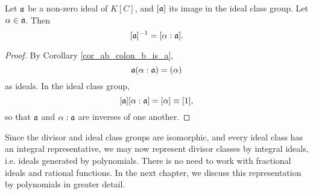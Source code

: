 \begin{proposition}
  \label{prop_integral_ideal_inverse}
  Let $\frak a$ be a non-zero ideal of $K[C]$,
  and $[\frak a]$ its image in the ideal class group.
  Let $\alpha \in \frak a$. Then
  \[ [\frak a]^{-1} = [\alpha : \frak a]. \]
\end{proposition}
\begin{proof}
  By Corollary \ref{cor_ab_colon_b_is_a},
  \[ \frak a(\alpha : \frak a) = (\alpha) \]
  as ideals.
  In the ideal class group,
  \[ [\frak a][\alpha : \frak a] = [\alpha] \equiv [1], \]
  so that $\frak a$ and $\alpha : \frak a$ are inverses of one another.
\end{proof}

Since the divisor and ideal class groups are isomorphic, and every ideal class has an integral representative,
we may now represent divisor classes by integral ideals, i.e. ideals generated by polynomials.
There is no need to work with fractional ideals and rational functions.
In the next chapter, we discuss this representation by polynomials in greater detail.

